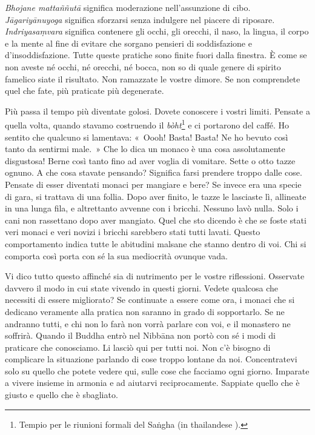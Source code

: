 \emph{Bhojane mattaññutā} significa moderazione nell'assunzione di cibo.
\emph{Jāgariyānuyoga} significa sforzarsi senza indulgere nel piacere di
riposare. \emph{Indriyasaṃvara} significa contenere gli occhi, gli
orecchi, il naso, la lingua, il corpo e la mente al fine di evitare che
sorgano pensieri di soddisfazione e d'insoddisfazione. Tutte queste
pratiche sono finite fuori dalla finestra. È come se non aveste né
occhi, né orecchi, né bocca, non so di quale genere di spirito famelico
siate il risultato. Non ramazzate le vostre dimore. Se non comprendete
quel che fate, più praticate più degenerate.

Più passa il tempo più diventate golosi. Dovete conoscere i vostri
limiti. Pensate a quella volta, quando stavamo costruendo il
\emph{bòht}\footnote{Tempio per le riunioni formali del Saṅgha (in
  thailandese ).} e ci portarono del caffé. Ho sentito che qualcuno
si lamentava: «~Oooh! Basta! Basta! Ne ho bevuto così tanto da sentirmi
male.~» Che lo dica un monaco è una cosa assolutamente disgustosa! Berne
così tanto fino ad aver voglia di vomitare. Sette o otto tazze ognuno. A
che cosa stavate pensando? Significa farsi prendere troppo dalle cose.
Pensate di esser diventati monaci per mangiare e bere? Se invece era una
specie di gara, si trattava di una follia. Dopo aver finito, le tazze le
lasciaste lì, allineate in una lunga fila, e altrettanto avvenne con i
bricchi. Nessuno lavò nulla. Solo i cani non rassettano dopo aver
mangiato. Quel che sto dicendo è che se foste stati veri monaci e veri
novizi i bricchi sarebbero stati tutti lavati. Questo comportamento
indica tutte le abitudini malsane che stanno dentro di voi. Chi si
comporta così porta con sé la sua mediocrità ovunque vada.

Vi dico tutto questo affinché sia di nutrimento per le vostre
riflessioni. Osservate davvero il modo in cui state vivendo in questi
giorni. Vedete qualcosa che necessiti di essere migliorato? Se
continuate a essere come ora, i monaci che si dedicano veramente alla
pratica non saranno in grado di sopportarlo. Se ne andranno tutti, e chi
non lo farà non vorrà parlare con voi, e il monastero ne soffrirà.
Quando il Buddha entrò nel Nibbāna non portò con sé i modi di
praticare che conosciamo. Li lasciò qui per tutti noi. Non c'è bisogno
di complicare la situazione parlando di cose troppo lontane da noi.
Concentratevi solo su quello che potete vedere qui, sulle cose che
facciamo ogni giorno. Imparate a vivere insieme in armonia e ad aiutarvi
reciprocamente. Sappiate quello che è giusto e quello che è sbagliato.


